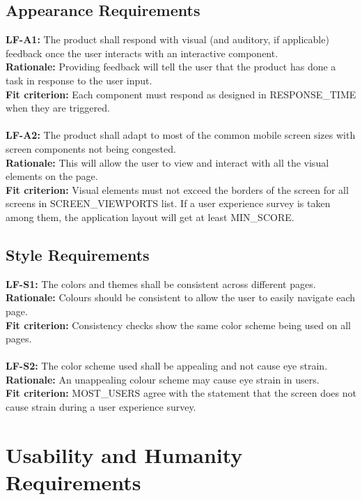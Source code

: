 \documentclass[12pt]{article}
\begin{document}
\subsection{Appearance Requirements}
  \textbf{LF-A1:} The product shall respond with visual (and auditory, if applicable) feedback once the user interacts with an interactive component.\\
  \textbf{Rationale:} Providing feedback will tell the user that the product has done a task in response to the user input.\\
  \textbf{Fit criterion:} Each component must respond as designed in RESPONSE\_TIME when they are triggered.\\\\
  \textbf{LF-A2:} The product shall adapt to most of the common mobile screen sizes with screen components not being congested.\\
  \textbf{Rationale:} This will allow the user to view and interact with all the visual elements on the page.\\
  \textbf{Fit criterion:} Visual elements must not exceed the borders of the screen for all screens in SCREEN\_VIEWPORTS list. If a user experience survey is taken among them, the application layout will get at least MIN\_SCORE.\\

\subsection{Style Requirements}
  \textbf{LF-S1:} The colors and themes shall be consistent across different pages.\\
  \textbf{Rationale:} Colours should be consistent to allow the user to easily navigate each page.\\
  \textbf{Fit criterion:} Consistency checks show the same color scheme being used on all pages.\\\\
  \textbf{LF-S2:} The color scheme used shall be appealing and not cause eye strain.\\
  \textbf{Rationale:} An unappealing colour scheme may cause eye strain in users.\\
  \textbf{Fit criterion:} MOST\_USERS agree with the statement that the screen does not cause strain during a user experience survey.\\

\section{Usability and Humanity Requirements}
\end{document}
